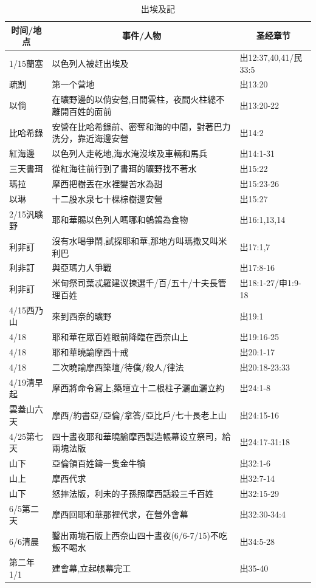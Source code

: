 \begin{table}[H]
\centering
\begin{tabular}{p{2cm}|p{11cm}|p{3.5cm}}\hline\hline
\multicolumn{1}{c|}{时间/地点}&\multicolumn{1}{c|}{事件/人物}&\multicolumn{1}{c}{圣经章节}\\\hline
1/15蘭塞&以色列人被赶出埃及&出12:37,40,41/民33:5\\\hline
疏割&第一个营地&出13:20\\\hline
以倘&在曠野邊的以倘安營,日間雲柱，夜間火柱總不離開百姓的面前&出13:20-22\\\hline
比哈希錄&安營在比哈希錄前、密奪和海的中間，對著巴力洗分，靠近海邊安營&出14:2\\\hline
紅海邊&以色列人走乾地,海水淹沒埃及車輛和馬兵&出14:1-31\\\hline
三天書珥&從紅海往前行到了書珥的曠野找不著水&出15:22\\\hline
瑪拉&摩西把樹丟在水裡變苦水為甜&出15:23-26\\\hline
以琳&十二股水泉七十棵棕樹邊安營&出15:27\\\hline
2/15汎曠野&耶和華賜以色列人嗎哪和鵪鶉為食物&出16:1,13,14\\\hline
利非訂&沒有水喝爭鬧,試探耶和華,那地方叫瑪撒又叫米利巴&出17:1,7\\\hline
利非訂&與亞瑪力人爭戰&出17:8-16\\\hline
利非訂&米甸祭司葉忒羅建议揀選千/百/五十/十夫長管理百姓&出18:1-27/申1:9-18\\\hline

4/15西乃山&來到西奈的曠野&出19:1\\\hline
4/18&耶和華在眾百姓眼前降臨在西奈山上&出19:16-25\\\hline
4/18&耶和華曉諭摩西十戒&出20:1-17\\\hline
4/18&二次曉諭摩西築壇/待僕/殺人/律法&出20:18-23:33\\\hline
4/19清早起&摩西將命令寫上,築壇立十二根柱子灑血灑立約&出24:1-8\\\hline
雲蓋山六天&摩西/約書亞/亞倫/拿答/亞比戶/七十長老上山&出24:15-16\\\hline
4/25第七天&四十晝夜耶和華曉諭摩西製造帳幕设立祭司，給兩塊法版&出24:17-31:18\\\hline
山下&亞倫領百姓鑄一隻金牛犢&出32:1-6\\\hline
山上&摩西代求&出32:7-14\\\hline
山下&怒摔法版，利未的子孫照摩西話殺三千百姓&出32:15-29\\\hline
6/5第二天&摩西回耶和華那裡代求，在營外會幕&出32:30-34:4\\\hline
6/6清晨&鑿出兩塊石版上西奈山四十晝夜(6/6-7/15)不吃飯不喝水&出34:5-28\\\hline
第二年1/1&建會幕,立起帳幕完工&出35-40\\\hline
\end{tabular}
\caption{出埃及記}
\end{table}



